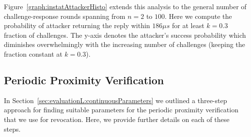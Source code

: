 

 Figure~\ref{graph:instatAttackerHisto} extends this analysis to the general number of challenge-response rounds spanning from $n=2$ to $100$. Here we compute the probability of attacker returning the reply within $186 \mu s$ for at least $k=0.3$ fraction of challenges. The y-axis denotes the attacker's success probability which diminishes overwhelmingly with the increasing number of challenges (keeping the fraction constant at $k=0.3$). 



\subsection{Periodic Proximity Verification}
\label{sec:newResults:cont}

In Section~\ref{sec:evaluationL:continuousParameters} we outlined a three-step approach for finding suitable parameters for the periodic proximity verification that we use for revocation. Here, we provide further details on each of these steps.

